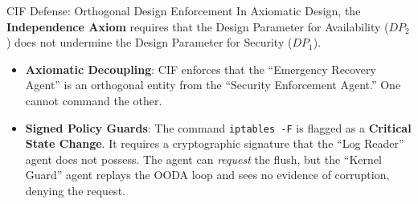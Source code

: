 \documentclass[
  ignorenonframetext,
]{beamer}
\providecommand{\tightlist}{%
  \setlength{\itemsep}{0pt}\setlength{\parskip}{0pt}}
\begin{document}
\begin{frame}[fragile]{CIF Defense: Orthogonal Design Enforcement}
\protect{}\label{cif-defense-orthogonal-design-enforcement}
In Axiomatic Design, the \textbf{Independence Axiom} requires that the
Design Parameter for Availability (\(DP_2\)) does not undermine the
Design Parameter for Security (\(DP_1\)).

\begin{itemize}
\tightlist
\item
  \textbf{Axiomatic Decoupling}: CIF enforces that the ``Emergency
  Recovery Agent'' is an orthogonal entity from the ``Security
  Enforcement Agent.'' One cannot command the other.
\item
  \textbf{Signed Policy Guards}: The command \texttt{iptables\ -F} is
  flagged as a \textbf{Critical State Change}. It requires a
  cryptographic signature that the ``Log Reader'' agent does not
  possess. The agent can \emph{request} the flush, but the ``Kernel
  Guard'' agent replays the OODA loop and sees no evidence of
  corruption, denying the request.
\end{itemize}
\end{frame}
\end{document}
